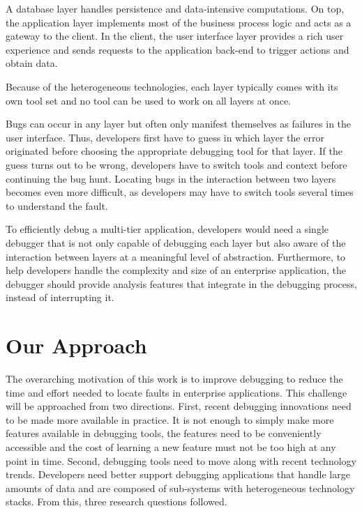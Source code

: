 A database layer handles persistence and data-intensive computations.
On top, the application layer implements most of the business process logic and acts as a gateway to the client.
In the client, the user interface layer provides a rich user experience and sends requests to the application back-end to trigger actions and obtain data.

Because of the heterogeneous technologies, each layer typically comes with its own tool set and no tool can be used to work on all layers at once.

Bugs can occur in any layer but often only manifest themselves as failures in the user interface.
Thus, developers first have to guess in which layer the error originated before choosing the appropriate debugging tool for that layer.
If the guess turns out to be wrong, developers have to switch tools and context before continuing the bug hunt.
Locating bugs in the interaction between two layers becomes even more difficult, as developers may have to switch tools several times to understand the fault.

To efficiently debug a multi-tier application, developers would need a single debugger that is not only capable of debugging each layer but also aware of the interaction between layers at a meaningful level of abstraction.
Furthermore, to help developers handle the complexity and size of an enterprise application, the debugger should provide analysis features that integrate in the debugging process, instead of interrupting it.

\section{Our Approach} %

The overarching motivation of this work is to improve debugging to reduce the time and effort needed to locate faults in enterprise applications.
This challenge will be approached from two directions.
First, recent debugging innovations need to be made more available in practice.
It is not enough to simply make more features available in debugging tools, the features need to be conveniently accessible and the cost of learning a new feature must not be too high at any point in time.
Second, debugging tools need to move along with recent technology trends.
Developers need better support debugging applications that handle large amounts of data and are composed of sub-systems with heterogeneous technology stacks.
From this, three research questions followed.

